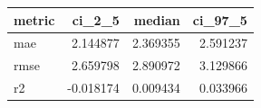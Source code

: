 \begin{tabular}{lrrr}
\toprule
metric & ci\_2\_5 & median & ci\_97\_5 \\
\midrule
mae & 2.144877 & 2.369355 & 2.591237 \\
rmse & 2.659798 & 2.890972 & 3.129866 \\
r2 & -0.018174 & 0.009434 & 0.033966 \\
\bottomrule
\end{tabular}

